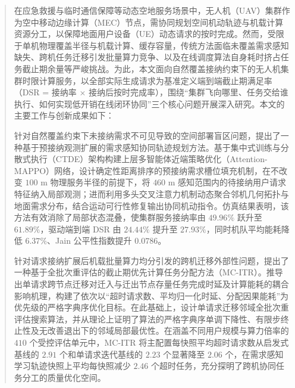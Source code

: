 
\begin{abstract}
在应急救援与临时通信保障等动态空地服务场景中，无人机（UAV）集群作为空中移动边缘计算（MEC）节点，需协同规划空间机动轨迹与机载计算资源分工，以保障地面用户设备（UE）动态请求的按时完成。然而，受限于单机物理覆盖半径与机载计算、缓存容量，传统方法面临未覆盖需求感知缺失、跨机任务迁移引发批量算力竞争、以及在线调度算法自身耗时挤占任务截止期余量等严峻挑战。为此，本文面向自然覆盖接纳约束下的无人机集群时限计算服务，以全部实际生成请求为基准定义端到端截止期满足率（DSR = 接纳率 $\times$ 接纳后按时完成率），围绕“集群飞向哪里、任务交给谁执行、如何实现低开销在线闭环协同”三个核心问题开展深入研究。本文的主要工作与创新成果如下：

针对自然覆盖约束下未接纳需求不可见导致的空间部署盲区问题，提出了一种基于预接纳观测扩展的需求感知协同轨迹规划方法。基于集中式训练与分散式执行（CTDE）架构构建上层多智能体近端策略优化（Attention-MAPPO）网络，设计确定性距离排序的预接纳需求槽位填充机制，在不改变 $100\text{ m}$ 物理服务半径的前提下，将 $460\text{ m}$ 感知范围内的待接纳用户请求特征纳入局部观测；进而利用多头交叉注意力机制动态聚合邻机几何拓扑与地面需求分布，结合运动可行性修复输出协同机动指令。仿真结果表明，该方法有效消除了局部状态混叠，使集群服务接纳率由 $49.96\%$ 跃升至 $61.89\%$，驱动端到端 DSR 由 $24.44\%$ 提升至 $27.93\%$，同时机队平均能耗降低 $6.37\%$、Jain 公平性指数提升 $0.0786$。

针对请求接纳扩展后机载批量算力均分引发的跨机迁移外部性问题，提出了一种基于全批次重评估的截止期优先计算任务分配方法（MC-ITR）。推导出单请求跨节点迁移对迁入与迁出节点存量任务完成时延及计算能耗的耦合影响机理，构建了依次以“超时请求数、平均归一化时延、分配因果能耗”为优先级的严格字典序优化目标。在此基础上，设计单请求迁移邻域全批次重评估搜索算法，并从理论上证明了算法的严格字典序单调下降性、有限步终止性及无改善退出下的邻域局部最优性。在涵盖不同用户规模与算力倍率的 $410$ 个受控评估单元中，MC-ITR 将主配置每快照平均超时请求数从启发式基线的 $2.91$ 个和单请求迭代基线的 $2.23$ 个显著降至 $2.06$ 个，在需求感知学习轨迹快照上平均每快照减少 $2.46$ 个超时任务，充分探明了跨机协同任务分工的质量优化空间。


\end{abstract}
